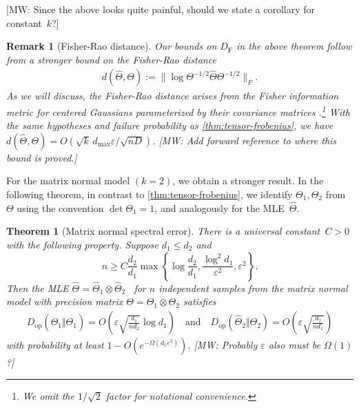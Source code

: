 \documentclass[aos]{imsart}
\newtheorem{theorem}{Theorem}[section]
\newtheorem*{remark*}{Remark}
\theoremstyle{definition}
\numberwithin{equation}{section}
\DeclareMathOperator{\PD}{PD}
\newcommand{\htheta}{\widehat{\Theta}}
\newcommand{\ot}{\otimes}
\newcommand{\eps}{\varepsilon}
\newcommand{\DF}{D_{\operatorname{F}}}
\newcommand{\Dop}{D_{\operatorname{op}}}
\def\dmax{d_{\max}}
\newcommand{\MW}[1]{{\color{red}[MW: #1]}}
\newcommand{\MW}[1]{{}}
\begin{document}
\MW{Since the above looks quite painful, should we state a corollary for constant~$k$?}

\begin{remark*}[Fisher-Rao distance]
Our bounds on $\DF$ in the above theorem follow from a stronger bound on the \emph{Fisher-Rao distance}
\begin{align}\label{eq:fisher rao}
  d(\htheta, \Theta):= \| \log \Theta^{-1/2} \htheta \Theta^{-1/2}\|_F.
\end{align}
As we will discuss, the Fisher-Rao distance arises from the Fisher information metric for centered Gaussians parameterized by their covariance matrices \citep{skovgaard1984riemannian}.\footnote{We omit the $1/\sqrt{2}$ factor for notational convenience.}
With the same hypotheses and failure probability as \cref{thm:tensor-frobenius}, we have $d(\htheta, \Theta)  = O(\sqrt{k} \, \dmax \eps/\sqrt{nD})$.
\MW{Add forward reference to where this bound is proved.}
\end{remark*}

For the matrix normal model $(k=2)$, we obtain a stronger result.
In the following theorem, in contrast to \cref{thm:tensor-frobenius}, we identify $\Theta_1, \Theta_2$ from $\Theta$ using the convention $\det \Theta_1 = 1$, and analogously for the MLE~$\htheta$.

\newcommand{\MatrixSpec}{%
There is a universal constant~$C>0$ with the following property.
Suppose $d_1 \leq d_2$ and
\[ n \geq C \frac{d_2}{d_1} \max \left\{\log \frac{d_2}{d_1},  \frac{\log^2 d_1}{\eps^2}, \eps^2\right\}. \]
Then the MLE $\htheta = \htheta_1 \ot \htheta_2$ \ for $n$ independent samples from the matrix normal model with precision matrix $\Theta = \Theta_1 \ot \Theta_2$ satisfies
\begin{align*}
  \Dop(\widehat{\Theta}_1 \Vert \Theta_1) = O\left(\eps \sqrt{\frac{d_1}{nd_2}} \log d_1\right)
\quad\text{and}\quad
\Dop(\widehat{\Theta}_2 \Vert \Theta_2) = O\left(\eps \sqrt{\frac{d_2}{nd_1}}\right)
\end{align*}
with probability at least  $1 - O(e^{ - \Omega( d_1 \eps^2)})$.
\MW{Probably $\eps$ also must be $\Omega(1)$?}}


\begin{theorem}[Matrix normal spectral error]\label{thm:matrix-normal}
\MatrixSpec
\end{theorem}
\end{document}
